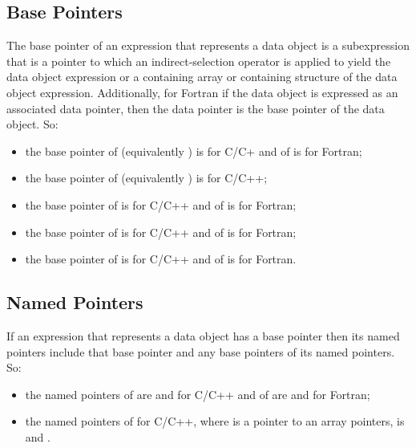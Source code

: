 
\subsection{Base Pointers}

The base pointer of an expression that represents a data object is a
subexpression that is a pointer to which an indirect-selection operator is
applied to yield the data object expression or a containing array or containing
structure of the data object expression. Additionally, for Fortran if the data
object is expressed as an associated data pointer, then the data pointer is the
base pointer of the data object. So:

\begin{itemize}
\item the base pointer of  (equivalently ) is 
      for C/C+ and of  is  for Fortran;

\item the base pointer of  (equivalently ) is
       for C/C++;

\item the base pointer of  is  for C/C++ and of
       is  for Fortran;

\item the base pointer of  is  for C/C++ and of
       is  for Fortran;

\item the base pointer of  is  for C/C++ and
      of  is  for Fortran.
\end{itemize}


\subsection{Named Pointers}

If an expression that represents a data object has a base pointer then its
named pointers include that base pointer and any base pointers of its named
pointers. So:

\begin{itemize}
\item the named pointers of  are  and
       for C/C++ and of  are 
      and  for Fortran;

\item the named pointers of  for C/C++, where
       is a pointer to an array pointers, is  and
      .
\end{itemize}

